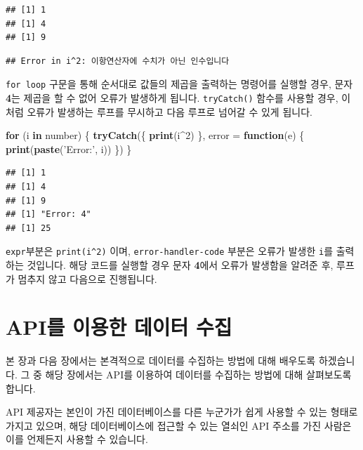 \documentclass[12pt,]{book}
\newenvironment{Shaded}{\begin{snugshade}}{\end{snugshade}}
\newcommand{\ControlFlowTok}[1]{\textcolor[rgb]{0.13,0.29,0.53}{\textbf{#1}}}
\newcommand{\DataTypeTok}[1]{\textcolor[rgb]{0.13,0.29,0.53}{#1}}
\newcommand{\DecValTok}[1]{\textcolor[rgb]{0.00,0.00,0.81}{#1}}
\newcommand{\KeywordTok}[1]{\textcolor[rgb]{0.13,0.29,0.53}{\textbf{#1}}}
\newcommand{\NormalTok}[1]{#1}
\newcommand{\OperatorTok}[1]{\textcolor[rgb]{0.81,0.36,0.00}{\textbf{#1}}}
\newcommand{\StringTok}[1]{\textcolor[rgb]{0.31,0.60,0.02}{#1}}
\begin{document}
\begin{verbatim}
## [1] 1
## [1] 4
## [1] 9
\end{verbatim}

\begin{verbatim}
## Error in i^2: 이항연산자에 수치가 아닌 인수입니다
\end{verbatim}

\texttt{for\ loop} 구문을 통해 순서대로 값들의 제곱을 출력하는 명령어를 실행할 경우, 문자 \textbf{4}는 제곱을 할 수 없어 오류가 발생하게 됩니다. \texttt{tryCatch()} 함수를 사용할 경우, 이처럼 오류가 발생하는 루프를 무시하고 다음 루프로 넘어갈 수 있게 됩니다.

\begin{Shaded}
\begin{Highlighting}[]
\ControlFlowTok{for}\NormalTok{ (i }\ControlFlowTok{in}\NormalTok{ number) \{}
  \KeywordTok{tryCatch}\NormalTok{(\{}
    \KeywordTok{print}\NormalTok{(i}\OperatorTok{^}\DecValTok{2}\NormalTok{)}
\NormalTok{  \}, }\DataTypeTok{error =} \ControlFlowTok{function}\NormalTok{(e) \{}
    \KeywordTok{print}\NormalTok{(}\KeywordTok{paste}\NormalTok{(}\StringTok{'Error:'}\NormalTok{, i))}
\NormalTok{    \})}
\NormalTok{\}}
\end{Highlighting}
\end{Shaded}

\begin{verbatim}
## [1] 1
## [1] 4
## [1] 9
## [1] "Error: 4"
## [1] 25
\end{verbatim}

\texttt{expr}부분은 \texttt{print(i\^{}2)} 이며, \texttt{error-handler-code} 부분은 오류가 발생한 \texttt{i}를 출력하는 것입니다. 해당 코드를 실행할 경우 문자 \textbf{4}에서 오류가 발생함을 알려준 후, 루프가 멈추지 않고 다음으로 진행됩니다.

\hypertarget{api---}{%
\chapter{API를 이용한 데이터 수집}\label{api---}}

본 장과 다음 장에서는 본격적으로 데이터를 수집하는 방법에 대해 배우도록 하겠습니다. 그 중 해당 장에서는 API를 이용하여 데이터를 수집하는 방법에 대해 살펴보도록 합니다.

API 제공자는 본인이 가진 데이터베이스를 다른 누군가가 쉽게 사용할 수 있는 형태로 가지고 있으며, 해당 데이터베이스에 접근할 수 있는 열쇠인 API 주소를 가진 사람은 이를 언제든지 사용할 수 있습니다.
\end{document}
